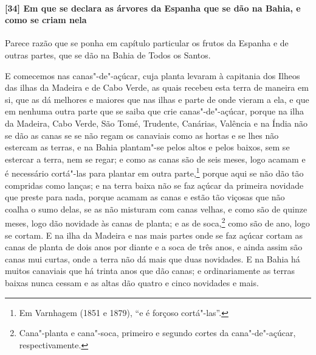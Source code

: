 \paragraph{[34] Em que se declara as árvores da Espanha que se dão na Bahia, e como se criam
nela}\quad
Parece razão que se ponha em capítulo particular os frutos da Espanha e de outras partes,
que se dão na Bahia de Todos os Santos.

E comecemos nas canas"-de"-açúcar, cuja planta levaram à capitania dos Ilheos das ilhas da
Madeira e de Cabo Verde, as quais recebeu esta terra de maneira em si, que as dá melhores
e maiores que nas ilhas e parte de onde vieram a ela, e que em nenhuma outra parte que se
saiba que crie canas"-de"-açúcar, porque na ilha da Madeira, Cabo Verde, São Tomé, Trudente,
Canárias, Valência e na Índia não se dão as canas se se não regam os canaviais como as
hortas e se lhes não estercam as terras, e na Bahia plantam"-se pelos altos e pelos baixos,
sem se estercar a terra, nem se regar; e como as canas são de seis meses, logo acamam e é
necessário cortá"-las para plantar em outra parte,\footnote{ Em Varnhagem (1851 e 1879),
``e é forçoso cortá"-las''.} porque aqui se não dão tão compridas como lanças; e na terra
baixa não se faz açúcar da primeira novidade que preste para nada, porque acamam as canas
e estão tão viçosas que não coalha o sumo delas, se as não misturam com canas velhas, e
como são de quinze meses, logo dão novidade às canas de planta; e as de soca,\footnote{
Cana"-planta e cana"-soca, primeiro e segundo cortes da cana"-de"-açúcar, respectivamente.}
como são de ano, logo se cortam. E na ilha da Madeira e nas mais partes onde se faz açúcar
cortam as canas de planta de dois anos por diante e a soca de três anos, e ainda assim são
canas mui curtas, onde a terra não dá mais que duas novidades. E na Bahia há muitos
canaviais que há trinta anos que dão canas; e ordinariamente as terras baixas nunca cessam
e as altas dão quatro e cinco novidades e mais.


